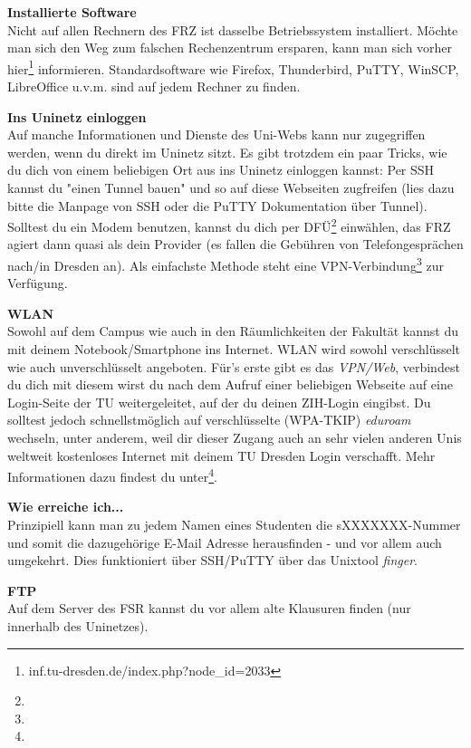 \textbf{Installierte Software} \\
Nicht auf allen Rechnern des FRZ ist dasselbe Betriebssystem installiert.
Möchte man sich den Weg zum falschen Rechenzentrum ersparen, kann man sich vorher hier\footnote{inf.tu-dresden.de/index.php?node\_id=2033} informieren.
Standardsoftware wie Firefox, Thunderbird, PuTTY, WinSCP, LibreOffice u.v.m. sind auf jedem Rechner zu finden.

\textbf{Ins Uninetz einloggen} \\
Auf manche Informationen und Dienste des Uni-Webs kann nur zugegriffen werden, wenn du direkt im Uninetz sitzt.
Es gibt trotzdem ein paar Tricks, wie du dich von einem beliebigen Ort aus ins Uninetz einloggen kannst:
Per SSH kannst du "einen Tunnel bauen" und so auf diese Webseiten zugfreifen (lies dazu bitte die Manpage von SSH oder die PuTTY Dokumentation über Tunnel).
Solltest du ein Modem benutzen, kannst du dich per DFÜ\footnote{} einwählen, das FRZ agiert dann quasi als dein Provider (es fallen die Gebühren von Telefongesprächen nach/in Dresden an).
Als einfachste Methode steht eine VPN-Verbindung\footnote{} zur Verfügung.

\textbf{WLAN} \\
Sowohl auf dem Campus wie auch in den Räumlichkeiten der Fakultät kannst du mit deinem Notebook/Smartphone ins Internet.
WLAN wird sowohl verschlüsselt wie auch unverschlüsselt angeboten.
Für's erste gibt es das \textit{VPN/Web}, verbindest du dich mit diesem wirst du nach dem Aufruf einer beliebigen Webseite auf eine Login-Seite der TU weitergeleitet, auf der du deinen ZIH-Login eingibst.
Du solltest jedoch schnellstmöglich auf verschlüsselte (WPA-TKIP) \textit{eduroam} wechseln, unter anderem, weil dir dieser Zugang auch an sehr vielen anderen Unis weltweit kostenloses Internet mit deinem TU Dresden Login verschafft.
Mehr Informationen dazu findest du unter\footnote{}.

\textbf{Wie erreiche ich...} \\
Prinzipiell kann man zu jedem Namen eines Studenten die sXXXXXXX-Nummer und somit die dazugehörige E-Mail Adresse herausfinden - und vor allem auch umgekehrt.
Dies funktioniert über SSH/PuTTY über das Unixtool \textit{finger}.

\textbf{FTP} \\
Auf dem Server des FSR kannst du vor allem alte Klausuren finden (nur innerhalb des Uninetzes).

